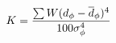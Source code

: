 \documentclass[10pt]{article}
\begin{document}
\begin{align*}K = {\sum W(d_\phi-\overline d_\phi)^4\over 100\sigma_\phi^4}\end{align*}
\end{document}
